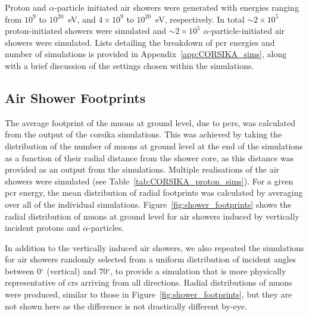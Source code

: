 Proton and $\alpha$-particle initiated air showers were generated with energies ranging from $10^{9}$ to $10^{20}$~eV, and $4\times10^{9}$ to $10^{20}$~eV, respectively. In total $\sim 2\times10^5$ proton-initiated showers were simulated and $\sim 2\times10^5$ $\alpha$-particle-initiated air showers were simulated. Lists detailing the breakdown of \gls{pcr} energies and number of simulations is provided in Appendix~\ref{app:CORSIKA_sims}, along with a brief discussion of the settings chosen within the simulations.


\subsection{Air Shower Footprints}\label{sec:CORSIKA_footprint}

The average footprint of the muons at ground level, due to \glspl{pcr}, was calculated from the output of the \gls{corsika} simulations. This was achieved by taking the distribution of the number of muons at ground level at the end of the simulations as a function of their radial distance from the shower core, as this distance was provided as an output from the simulations. Multiple realisations of the air showers were simulated (see Table~\ref{tab:CORSIKA_proton_sims}). For a given \gls{pcr} energy, the mean distribution of radial footprints was calculated by averaging over all of the individual simulations. Figure~\ref{fig:shower_footprints} shows the radial distribution of muons at ground level for air showers induced by vertically incident protons and $\alpha$-particles.

In addition to the vertically induced air showers, we also repeated the simulations for air showers randomly selected from a uniform distribution of incident angles between 0$^\circ$ (vertical) and 70$^\circ$, to provide a simulation that is more physically representative of \glspl{cr} arriving from all directions. Radial distributions of muons were produced, similar to those in Figure~\ref{fig:shower_footprints}, but they are not shown here as the difference is not drastically different by-eye.



